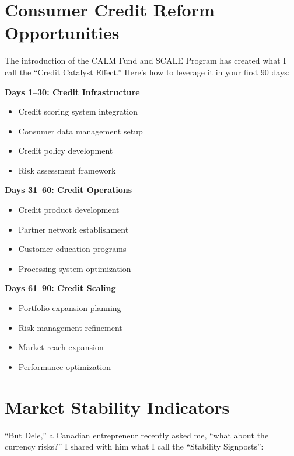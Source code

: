 \section{Consumer Credit Reform Opportunities}\label{sec:credit-reforms}

The introduction of the CALM Fund and SCALE Program has created what I call the ``Credit Catalyst Effect.'' Here's how to leverage it in your first 90 days:

\textbf{Days 1--30: Credit Infrastructure}
\begin{itemize}
    \item Credit scoring system integration
    \item Consumer data management setup
    \item Credit policy development
    \item Risk assessment framework
\end{itemize}

\textbf{Days 31--60: Credit Operations}
\begin{itemize}
    \item Credit product development
    \item Partner network establishment
    \item Customer education programs
    \item Processing system optimization
\end{itemize}

\textbf{Days 61--90: Credit Scaling}
\begin{itemize}
    \item Portfolio expansion planning
    \item Risk management refinement
    \item Market reach expansion
    \item Performance optimization
\end{itemize}

\section{Market Stability Indicators}\label{sec:market-stability}

``But Dele,'' a Canadian entrepreneur recently asked me, ``what about the currency risks?'' I shared with him what I call the ``Stability Signposts'':


